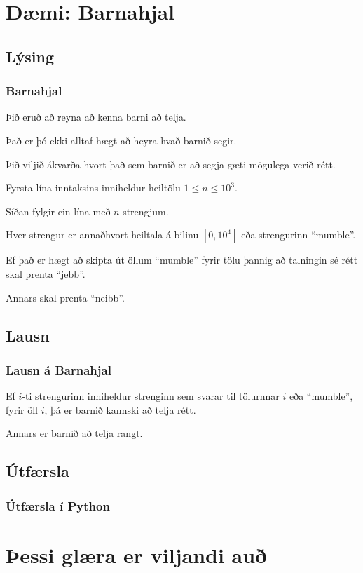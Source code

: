 \section{Dæmi: Barnahjal}
\subsection{Lýsing}
{
    \frametitle{Barnahjal}
    {
        \item<1-> Þið eruð að reyna að kenna barni að telja.
        \item<2-> Það er þó ekki alltaf hægt að heyra hvað barnið segir.
        \item<3-> Þið viljið ákvarða hvort það sem barnið er að segja gæti mögulega verið rétt.
        \item<4-> Fyrsta lína inntaksins inniheldur heiltölu $1 \leq n \leq 10^3$.
        \item<5-> Síðan fylgir ein lína með $n$ strengjum.
        \item<6-> Hver strengur er annaðhvort heiltala á bilinu $[0, 10^4]$ eða strengurinn ``mumble''.
        \item<7-> Ef það er hægt að skipta út öllum ``mumble'' fyrir tölu þannig að talningin sé rétt skal prenta ``jebb''.
        \item<8-> Annars skal prenta ``neibb''.
    }
}

\subsection{Lausn}
{
    \frametitle{Lausn á Barnahjal}
    {
        \item<1-> Ef $i$-ti strengurinn inniheldur strenginn sem svarar til tölurnnar $i$ eða ``mumble'', fyrir öll $i$,
            þá er barnið kannski að telja rétt.
        \item<2-> Annars er barnið að telja rangt.
    }
}

\subsection{Útfærsla}
{
    \frametitle{Útfærsla í Python}
}

\section{Þessi glæra er viljandi auð}
{
}


